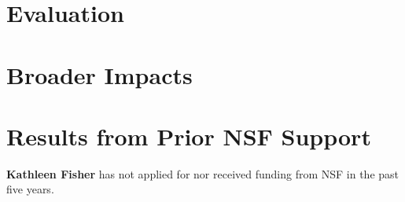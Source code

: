 




\section{Evaluation}
\label{sec:eval}


\section{Broader Impacts}
\label{sec:impact}


\section{Results from Prior NSF Support}
\label{sec:prior-support}

\noindent
{\bf Kathleen Fisher} has not applied for nor received funding from NSF in the past
five years.

\medskip

